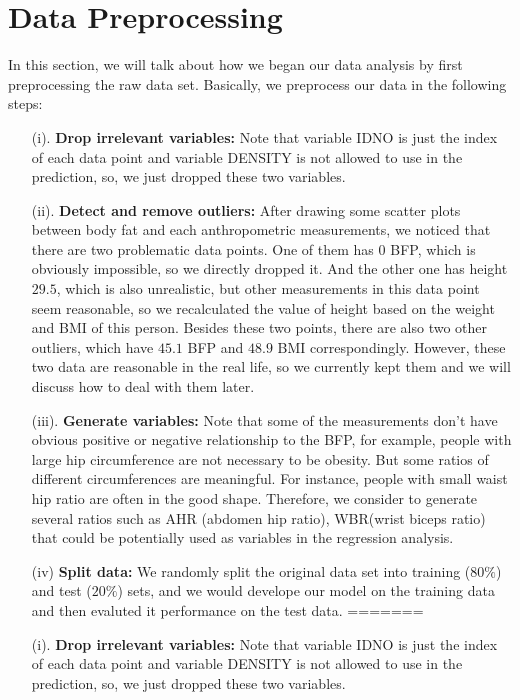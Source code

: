 \documentclass[letterpaper,10pt]{article}
\begin{document}
\section{Data Preprocessing}
In this section, we will talk about how we began our data analysis by first preprocessing the raw data set. Basically, we preprocess our data in the following steps:
\begin{itemize}
<<<<<<< HEAD
\item[(i).] \textbf{Drop irrelevant variables:} Note that variable IDNO is just the index of each data point and variable DENSITY is not allowed to use in the prediction, so, we just dropped these two variables.
\item[(ii).] \textbf{Detect and remove outliers:} After drawing some scatter plots between body fat and each anthropometric measurements, we noticed that there are two problematic data points. One of them has $0$ BFP, which is obviously impossible, so we directly dropped it. And the other one has  height $29.5$, which is also unrealistic, but other measurements in this data point seem reasonable, so we recalculated the value of height based on the weight and BMI of this person. Besides these two points, there are also two other outliers, which have $45.1$ BFP and $48.9$ BMI correspondingly. However, these two data are reasonable in the real life, so we currently kept them and we will discuss how to deal with them later.
\item[(iii).] \textbf{Generate variables:} Note that some of the measurements don't have obvious positive or negative relationship to the BFP, for example, people with large hip circumference are not necessary to be obesity. But some ratios of different circumferences are meaningful. For instance, people with small waist hip ratio are often in the good shape. Therefore, we consider to generate several ratios such as AHR (abdomen hip ratio), WBR(wrist biceps ratio) that could be potentially used as variables in the regression analysis.
\item[(iv)] \textbf{Split data:} We randomly split the original data set into training ($80\%$) and test ($20\%$) sets, and we would develope our model on the training data and then evaluted it performance on the test data.
=======
\item[(i).] \textbf{Drop irrelevant variables:} Note that variable IDNO is just the index of each data point and variable DENSITY is not allowed to use in the prediction, so, we just dropped these two variables. 

\end{itemize}
\end{document}
